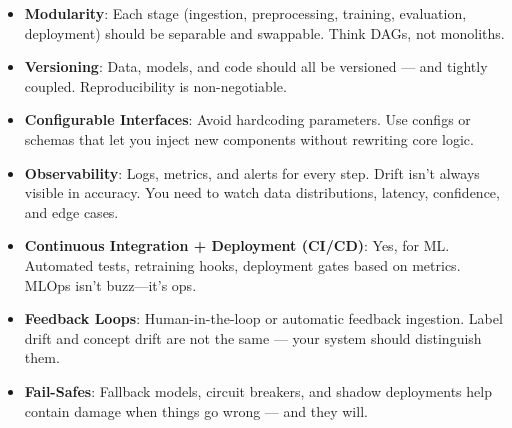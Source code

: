 \begin{itemize}
    \item \textbf{Modularity}: Each stage (ingestion, preprocessing, training, evaluation, deployment) should be separable and swappable. Think DAGs, not monoliths.

    \item \textbf{Versioning}: Data, models, and code should all be versioned — and tightly coupled. Reproducibility is non-negotiable.

    \item \textbf{Configurable Interfaces}: Avoid hardcoding parameters. Use configs or schemas that let you inject new components without rewriting core logic.

    \item \textbf{Observability}: Logs, metrics, and alerts for every step. Drift isn’t always visible in accuracy. You need to watch data distributions, latency, confidence, and edge cases.

    \item \textbf{Continuous Integration + Deployment (CI/CD)}: Yes, for ML. Automated tests, retraining hooks, deployment gates based on metrics. MLOps isn’t buzz—it’s ops.

    \item \textbf{Feedback Loops}: Human-in-the-loop or automatic feedback ingestion. Label drift and concept drift are not the same — your system should distinguish them.

    \item \textbf{Fail-Safes}: Fallback models, circuit breakers, and shadow deployments help contain damage when things go wrong — and they will.
\end{itemize}

\newpage

